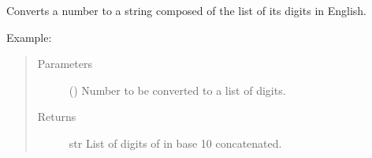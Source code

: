 \documentclass[letterpaper,10pt,english]{sphinxmanual}
\begin{document}

\begin{fulllineitems}
\label{\detokenize{run_circuit:run_circuit.int_name}}
Converts a number to a string composed of the list of its digits in English.
\begin{description}
\item[{Example:}] \leavevmode
{}%
\begin{sphinxVerbatim}[commandchars=\\\{\},formatcom=\footnotesize]
\end{sphinxVerbatim}

\end{description}
\begin{quote}\begin{description}
\item[{Parameters}] \leavevmode
{} () \textendash{} Number to be converted to a list of digits.

\item[{Returns}] \leavevmode
str \textendash{} List of digits of  in base 10 concatenated.

\end{description}\end{quote}

\end{fulllineitems}

\end{document}
